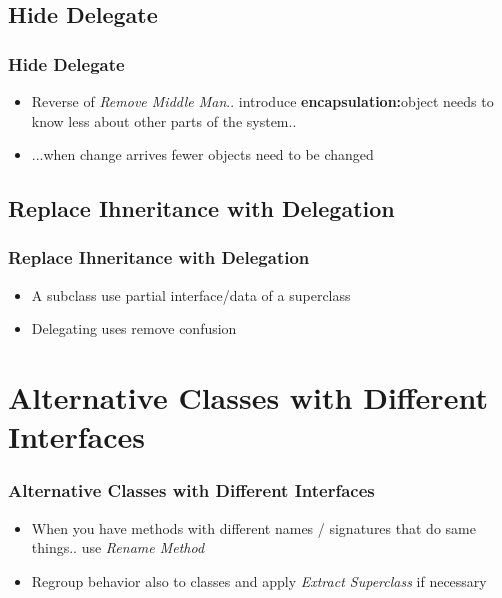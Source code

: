 \documentclass{beamer}
\begin{document}
\subsection{Hide Delegate}
\begin{frame}
  \frametitle{Hide Delegate}
  \begin{itemize}
	\item<+-> Reverse of \textit{Remove Middle Man}.. introduce \textbf{encapsulation:}object needs to know less about other parts of the system..
	\item<+-> ...when change arrives fewer objects need to be changed
   \end{itemize}
\end{frame}

\subsection{Replace Ihneritance with Delegation}
\begin{frame}
  \frametitle{Replace Ihneritance with Delegation}
  \begin{itemize}
	\item<+-> A subclass use partial interface/data of a superclass
	\item<+-> Delegating uses remove confusion
   \end{itemize}
\end{frame}

\section{Alternative Classes with Different Interfaces}
\begin{frame}
  \frametitle{Alternative Classes with Different Interfaces}
  \begin{itemize}
	\item<+-> When you have methods with different names / signatures that do same things.. use \textit{Rename Method}
	\item<+-> Regroup behavior also to classes and apply \textit{Extract Superclass} if necessary
   \end{itemize}
\end{frame}
\end{document}
